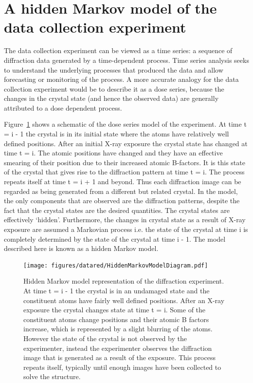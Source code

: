 \section{A hidden Markov model of the data collection experiment}
\label{sec:A hidden Markov model of the data collection experiment}
The data collection experiment can be viewed as a time series: a sequence of diffraction data generated by a time-dependent process.
Time series analysis seeks to understand the underlying processes that produced the data and allow forecasting or monitoring of the process.
A more accurate analogy for the data collection experiment would be to describe it as a dose series, because the changes in the crystal state (and hence the observed data) are generally attributed to a dose dependent process.

Figure~\ref{fig:Hidden Markov Model diagram} shows a schematic of the dose series model of the experiment.
At time t = i - 1 the crystal is in its initial state where the atoms have relatively well defined positions.
After an initial X-ray exposure the crystal state has changed at time t = i.
The atomic positions have changed and they have an effective smearing of their position due to their increased atomic B-factors.
It is this state of the crystal that gives rise to the diffraction pattern at time t = i.
The process repeats itself at time t = i + 1 and beyond.
Thus each diffraction image can be regarded as being generated from a different but related crystal.
In the model, the only components that are observed are the diffraction patterns, despite the fact that the crystal states are the desired quantities.
The crystal states are effectively `hidden'.
Furthermore, the changes in crystal state as a result of X-ray exposure are assumed a Markovian process i.e. the state of the crystal at time i is completely determined by the state of the crystal at time i - 1.
The model described here is known as a hidden Markov model.
\begin{figure}[ht!]
    \centering
    \texttt{[image: figures/datared/HiddenMarkovModelDiagram.pdf]}
    \caption[Hidden Markov model representation of the diffraction experiment.]{Hidden Markov model representation of the diffraction experiment.
    At time t = i - 1 the crystal is in an undamaged state and the constituent atoms have fairly well defined positions.
    After an X-ray exposure the crystal changes state at time t = i.
    Some of the constituent atoms change positions and their atomic B factors increase, which is represented by a slight blurring of the atoms.
    However the state of the crystal is not observed by the experimenter, instead the experimenter observes the diffraction image that is generated as a result of the exposure.
    This process repeats itself, typically until enough images have been collected to solve the structure.}
    \label{fig:Hidden Markov Model diagram}
\end{figure}

